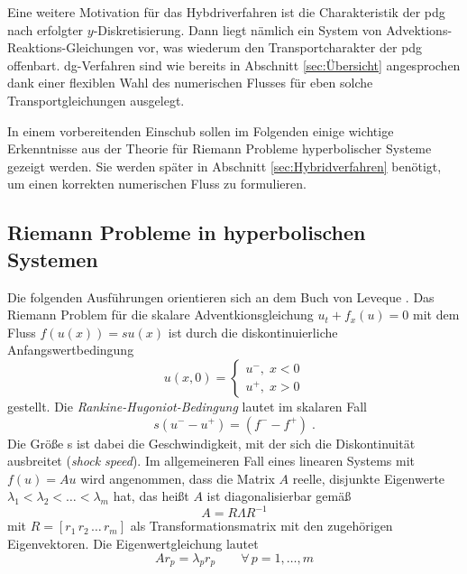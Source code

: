 Eine weitere Motivation für das Hybdriverfahren ist die Charakteristik der \ac{pdg} nach erfolgter $y$-Diskretisierung. Dann liegt nämlich ein System von Advektions-Reaktions-Gleichungen vor, was wiederum den Transportcharakter der \ac{pdg} offenbart. \ac{dg}-Verfahren sind wie bereits in Abschnitt \ref{sec:Übersicht} angesprochen dank einer flexiblen Wahl des numerischen Flusses für eben solche Transportgleichungen ausgelegt.

In einem vorbereitenden Einschub sollen im Folgenden einige wichtige Erkenntnisse aus der Theorie für Riemann Probleme hyperbolischer Systeme gezeigt werden. Sie werden später in Abschnitt \ref{sec:Hybridverfahren} benötigt, um einen korrekten numerischen Fluss zu formulieren.

\subsection{Riemann Probleme in hyperbolischen Systemen}\label{sec:riemann}
Die folgenden Ausführungen orientieren sich an dem Buch von Leveque \cite{buchLeveque}.
Das Riemann Problem für die skalare Adventkionsgleichung $u_t + f_x(u) = 0$ mit dem Fluss $f(u(x)) = s u(x)$ ist durch die diskontinuierliche Anfangswertbedingung
\begin{equation}
  u(x,0) = \begin{cases} u^- , \; x < 0 \\
                         u^+ , \; x > 0
           \end{cases}
\end{equation}
gestellt.  Die \emph{Rankine-Hugoniot-Bedingung} lautet im skalaren Fall
\begin{equation}
  s(u^- - u^+) = (f^- - f^+) \; .
  \label{eq:rhc}
\end{equation}
Die Größe s ist dabei die Geschwindigkeit, mit der sich die Diskontinuität ausbreitet (\emph{shock speed}). Im allgemeineren Fall eines linearen Systems mit $f(u) = A u$ wird angenommen, dass die Matrix $A$ reelle, disjunkte Eigenwerte $\lambda_1 < \lambda_2 < \dots < \lambda_m$ hat, das heißt $A$ ist diagonalisierbar gemäß
\begin{equation}
  A = R \Lambda R^{-1}
\end{equation}
mit $R=[r_1 \, r_2 \, \dots \, r_m]$ als Transformationsmatrix mit den zugehörigen Eigenvektoren. Die Eigenwertgleichung lautet
\begin{equation}
  Ar_p = \lambda_p r_p \qquad \forall \, p=1,\dots, m
  \label{eq:EWeq_A}
\end{equation}
